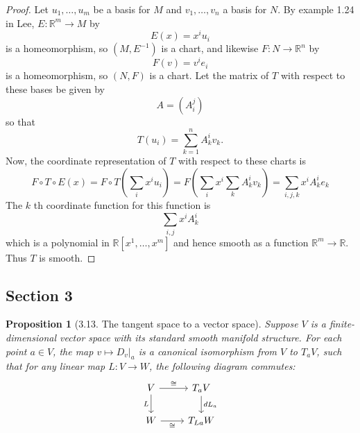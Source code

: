 \documentclass[reqno]{amsart}
\theoremstyle{plain}%
\newtheorem{proposition}[theorem]{Proposition}
\theoremstyle{definition}
\theoremstyle{remark}
\begin{document}
    \begin{proof}
        Let
        $u_1, \ldots, u_m$ be a basis for $M$ and 
         $v_1, \ldots, v_n$ a basis for $N$. By example 1.24 in Lee,
         $E  \colon \mathbb{R}^{m} \to M$ by
         \[
         E(x) = x^{i}u_i
         \] 
         is a homeomorphism, so $\left( M, E^{-1} \right) $ is a chart, and
         likewise
         $F  \colon N \to \mathbb{R}^{n}$ by
         \[
         F(v) = v^{i} e_i
         \] 
         is a homeomorphism, so $\left( N, F \right) $ is a chart.
         Let the matrix of $T$ with respect to these bases be given by
         \[
         A = \left( A_{i}^{j} \right) 
         \] 
         so that
         \[
         T(u_i) = \sum_{k=1}^{n} A_{k}^{i} v_k.
         \] 
         Now, the
         coordinate representation of $T$ with respect to these charts is
         \[
         F \circ T \circ E (x) =
         F \circ T \left( \sum_{i} x^{i} u_i \right) 
         = F \left( \sum_i x^{i} \sum_{k} A_{k}^{i} v_k \right) 
         = \sum_{i,j,k} x^{i} A_{k}^{i} e_k
         \] 
         The $k$ th coordinate function for this function is
         \[
         \sum_{i,j} x^{i} A_k^{i} 
         \] 
         which is a polynomial 
         in $\mathbb{R} \left[ x^{1},\ldots, x^{m} \right] $ and hence
         smooth as a function
         $\mathbb{R}^{m} \to \mathbb{R}$. Thus
         $T$ is smooth.
    \end{proof}

    \subsection*{Section 3}

    \begin{proposition}[3.13. The tangent space to a vector space]
        Suppose $V$ is a finite-dimensional vector space with its standard
        smooth manifold structure. For each point $a \in V$, the map
        $v \mapsto D_{v}|_{a}$ is a canonical isomorphism from $V$ to
        $T_a V$, such that for any linear map $L  \colon V \to W$, the
        following diagram commutes:
        \begin{equation*}
        \begin{tikzcd}
            V \ar[r, "\cong"] \ar[d, "L"'] & T_aV \ar[d, "dL_a"] \\
            W \ar[r, "\cong"'] & T_{La}W
        \end{tikzcd}
        \end{equation*}
    \end{proposition}
\end{document}
